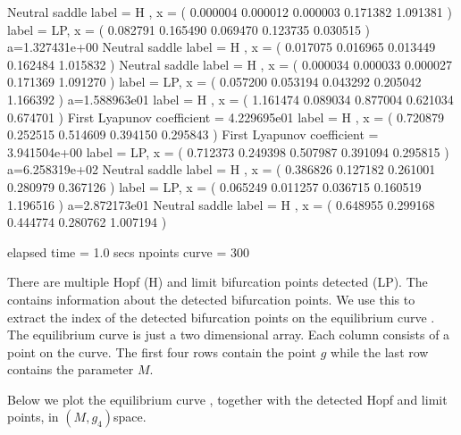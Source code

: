 \documentclass[letterpaper,10pt,english]{jupyterBook}
\begin{document}
\begin{sphinxVerbatim}[commandchars=\\\{\}]
Neutral saddle
label = H , x = ( 0.000004 \PYGZhy{}0.000012 \PYGZhy{}0.000003 \PYGZhy{}0.171382 1.091381 )
label = LP, x = ( 0.082791 \PYGZhy{}0.165490 \PYGZhy{}0.069470 \PYGZhy{}0.123735 0.030515 )
a=1.327431e+00
Neutral saddle
label = H , x = ( 0.017075 \PYGZhy{}0.016965 \PYGZhy{}0.013449 \PYGZhy{}0.162484 1.015832 )
Neutral saddle
label = H , x = ( 0.000034 \PYGZhy{}0.000033 \PYGZhy{}0.000027 \PYGZhy{}0.171369 1.091270 )
label = LP, x = ( \PYGZhy{}0.057200 0.053194 0.043292 \PYGZhy{}0.205042 1.166392 )
a=1.588963e\PYGZhy{}01
label = H , x = ( \PYGZhy{}1.161474 \PYGZhy{}0.089034 0.877004 \PYGZhy{}0.621034 0.674701 )
First Lyapunov coefficient = 4.229695e\PYGZhy{}01
label = H , x = ( \PYGZhy{}0.720879 \PYGZhy{}0.252515 0.514609 \PYGZhy{}0.394150 0.295843 )
First Lyapunov coefficient = \PYGZhy{}3.941504e+00
label = LP, x = ( \PYGZhy{}0.712373 \PYGZhy{}0.249398 0.507987 \PYGZhy{}0.391094 0.295815 )
a=\PYGZhy{}6.258319e+02
Neutral saddle
label = H , x = ( \PYGZhy{}0.386826 \PYGZhy{}0.127182 0.261001 \PYGZhy{}0.280979 0.367126 )
label = LP, x = ( 0.065249 0.011257 \PYGZhy{}0.036715 \PYGZhy{}0.160519 1.196516 )
a=\PYGZhy{}2.872173e\PYGZhy{}01
Neutral saddle
label = H , x = ( 0.648955 0.299168 \PYGZhy{}0.444774 \PYGZhy{}0.280762 \PYGZhy{}1.007194 )

elapsed time  = 1.0 secs
npoints curve = 300
\end{sphinxVerbatim}

\sphinxAtStartPar
There are multiple Hopf (H) and limit bifurcation points detected (LP). The 
 contains information about the detected bifurcation points. We
use this to extract the index of the detected bifurcation points on the
equilibrium curve . The equilibrium curve  is just a two
dimensional array. Each column consists of a point on the curve. The first four
rows contain the point \(g\) while the last row contains the parameter \(M\).

\sphinxAtStartPar
Below we plot the equilibrium curve , together with the detected Hopf and limit
points, in \((M,g_4)\)\sphinxhyphen{}space.
\end{document}

